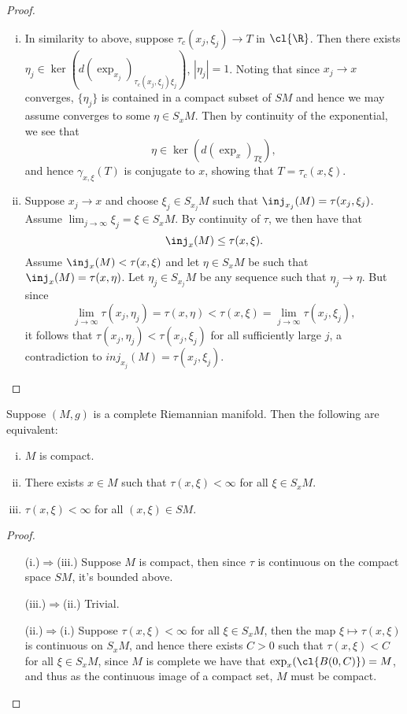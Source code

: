 \begin{proof}
\begin{enumerate}[i.]
\item In similarity to above, suppose $\tau_c(x_j,\xi_j)\to T$ in $\cl{\R}$.  Then there exists $\eta_j\in\ker\left(d(\exp_{x_j})_{\tau_c(x_j,\xi_j)\xi_j}\right)$, $|\eta_j|=1$.  Noting that since $x_j\to x$ converges, $\{\eta_j\}$ is contained in a compact subset of $SM$ and hence we may assume converges to some $\eta\in S_xM$.  Then by continuity of the exponential, we see that
$$\eta\in\ker\left(d(\exp_x)_{T\xi}\right),$$
and hence $\gamma_{x,\xi}(T)$ is conjugate to $x$, showing that $T=\tau_c(x,\xi)$.  

\item Suppose $x_j\to x$ and choose $\xi_j\in S_{x_j}M$ such that $\inj_{x_j}(M)=\tau(x_j,\xi_j)$.  Assume $\lim_{j\to\infty}\xi_j=\xi\in S_xM$.  By continuity of $\tau$, we then have that
$$\inj_x(M)\leq\tau(x,\xi).$$
Assume $\inj_x(M)<\tau(x,\xi)$ and let $\eta\in S_xM$ be such that $\inj_x(M)=\tau(x,\eta)$.  Let $\eta_j\in S_{x_j}M$ be any sequence such that $\eta_j\to\eta$.  But since
$$\lim_{j\to\infty}\tau(x_j,\eta_j)=\tau(x,\eta)<\tau(x,\xi)=\lim_{j\to\infty}\tau(x_j,\xi_j),$$
it follows that $\tau(x_j,\eta_j)<\tau(x_j,\xi_j)$ for all sufficiently large $j$, a contradiction to $inj_{x_j}(M)=\tau(x_j,\xi_j)$.
\end{enumerate}
\end{proof}


\begin{prop}
    Suppose $(M,g)$ is a complete Riemannian manifold.  Then the following are equivalent:
    \begin{enumerate}[i.]
    \item $M$ is compact.
    \item There exists $x\in M$ such that $\tau(x,\xi)<\infty$ for all $\xi\in S_xM$.
    \item $\tau(x,\xi)<\infty$ for all $(x,\xi)\in SM$.	
    \end{enumerate}
\end{prop}

\begin{proof}
\begin{itemize}
\item[(i.)$\Rightarrow$(iii.)] Suppose $M$ is compact, then since $\tau$ is continuous on the compact space $SM$, it's bounded above.

\item[(iii.)$\Rightarrow$(ii.)] Trivial.

\item[(ii.)$\Rightarrow$(i.)] Suppose $\tau(x,\xi)<\infty$ for all $\xi\in S_xM$, then the map $\xi\mapsto\tau(x,\xi)$ is continuous on $S_xM$, and hence there exists $C>0$ such that $\tau(x,\xi)<C$ for all $\xi\in S_xM$, since $M$ is complete we have that $\exp_x(\cl{B(0,C)})=M$, and thus as the continuous image of a compact set, $M$ must be compact.
\end{itemize}
\end{proof}


